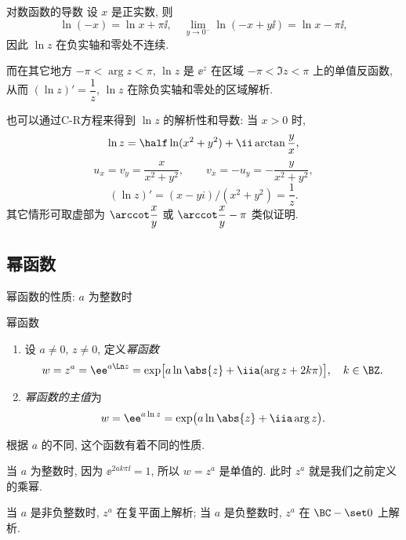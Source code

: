 \begin{frame}{对数函数的导数}
\beqskip{1pt}
	\onslide<+->
	设 $x$ 是正实数, 
	\onslide<+->
	则
	\[\ln (-x)=\ln x+\pi\ii,\quad
	\lim_{y\to0^-}\ln (-x+y\ii)=\ln x-\pi\ii,
	\]
	\onslide<+->
	因此 $\ln z$ 在负实轴和零处不连续.

	\onslide<+->
	而在其它地方 $-\pi<\arg z<\pi$, $\ln z$ 是 $\ee^z$ 在区域 $-\pi<\Im z<\pi$ 上的单值反函数, 
	\onslide<+->
	从而
	\alert{$(\ln z)'=\dfrac 1z$},
	\alert{$\ln z$ 在除负实轴和零处的区域解析}.

	\onslide<+->
	也可以通过C-R方程来得到 $\ln z$ 的解析性和导数: 当 $x>0$ 时,
	\[\ln z=\half \ln(x^2+y^2)+\ii\arctan \frac yx,
	\]
	\onslide<+->
	\[u_x=v_y=\frac x{x^2+y^2},\qquad v_x=-u_y=-\frac y{x^2+y^2},
	\]
	\[(\ln z)'=(x-yi)/(x^2+y^2)=\frac 1z.
	\]
	其它情形可取虚部为 $\arccot\dfrac xy$ 或 $\arccot\dfrac xy-\pi$ 类似证明.
\endgroup
\end{frame}


\subsection{幂函数}

\begin{frame}{幂函数的性质: $a$ 为整数时}
	\onslide<+->
	\begin{third}{幂函数}
		\begin{enumerate}
			\item 设 $a\neq 0$, $z\neq 0$, 定义\emph{幂函数}
			\[w=z^a=\ee^{a\Ln z}
			=\exp\bigl[a\ln\abs{z}+\iia(\arg z+2k\pi)\bigr],\quad k\in\BZ.
	\]
			\item \emph{幂函数的主值}为
			\[w=\ee^{a\ln z}=\exp\bigl(a\ln\abs{z}+\iia\arg z\bigr).
	\]
		\end{enumerate}
		\vspace{-\baselineskip}
	\end{third}
	\onslide<+->
	根据 $a$ 的不同, 这个函数有着不同的性质.

	\onslide<+->
	当 $a$ 为整数时, 因为 $\ee^{2ak\pi\ii}=1$, 所以 $w=z^a$ 是单值的.
	\onslide<+->
	此时 $z^a$ 就是我们之前定义的乘幂.

	\onslide<+->
	当 $a$ 是非负整数时, $z^a$ 在复平面上解析;
	\onslide<+->
	当 $a$ 是负整数时, $z^a$ 在 $\BC-\set0$ 上解析.
\end{frame}



